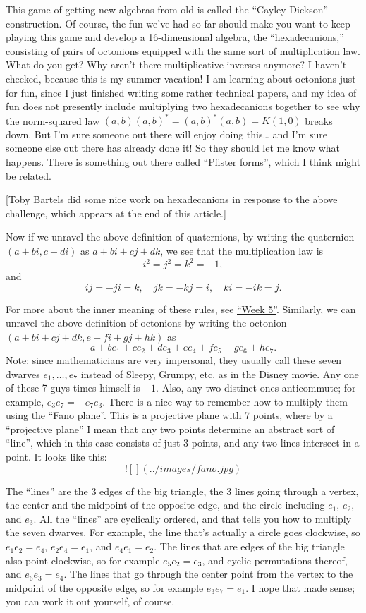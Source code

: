 \documentclass{article}
\begin{document}
This game of getting new algebras from old is called the
``Cayley-Dickson'' construction. Of course, the fun we've had so far
should make you want to keep playing this game and develop a
16-dimensional algebra, the ``hexadecanions,'' consisting of pairs of
octonions equipped with the same sort of multiplication law. What do you
get? Why aren't there multiplicative inverses anymore? I haven't
checked, because this is my summer vacation! I am learning about
octonions just for fun, since I just finished writing some rather
technical papers, and my idea of fun does not presently include
multiplying two hexadecanions together to see why the norm-squared law
\((a,b) (a,b)^* = (a,b)^* (a,b) = K (1,0)\) breaks down. But I'm sure
someone out there will enjoy doing this\ldots{} and I'm sure someone
else out there has already done it! So they should let me know what
happens. There is something out there called ``Pfister forms'', which I
think might be related.

{[}Toby Bartels did some nice work on hexadecanions in response to the
above challenge, which appears at the end of this article.{]}

Now if we unravel the above definition of quaternions, by writing the
quaternion \((a+bi,c+di)\) as \(a+bi+cj+dk\), we see that the
multiplication law is \[i^2 = j^2 = k^2 = -1,\] and
\[ij = -ji = k, \quad jk = -kj = i, \quad ki = -ik = j.\]

For more about the inner meaning of these rules, see
\protect\hyperlink{week5}{``Week 5''}. Similarly, we can unravel the
above definition of octonions by writing the octonion
\((a+bi+cj+dk,e+fi+gj+hk)\) as
\[a + b e_1 + c e_2 + d e_3 + e e_4 + f e_5 + g e_6 + h e_7.\] Note:
since mathematicians are very impersonal, they usually call these seven
dwarves \(e_1,\ldots,e_7\) instead of Sleepy, Grumpy, etc. as in the
Disney movie. Any one of these 7 guys times himself is \(-1\). Also, any
two distinct ones anticommute; for example, \(e_3 e_7 = -e_7 e_3\).
There is a nice way to remember how to multiply them using the ``Fano
plane''. This is a projective plane with 7 points, where by a
``projective plane'' I mean that any two points determine an abstract
sort of ``line'', which in this case consists of just 3 points, and any
two lines intersect in a point. It looks like this:
\[![](../images/fano.jpg)\]

The ``lines'' are the 3 edges of the big triangle, the 3 lines going
through a vertex, the center and the midpoint of the opposite edge, and
the circle including \(e_1\), \(e_2\), and \(e_3\). All the ``lines''
are cyclically ordered, and that tells you how to multiply the seven
dwarves. For example, the line that's actually a circle goes clockwise,
so \(e_1 e_2 = e_4\), \(e_2 e_4 = e_1\), and \(e_4 e_1 = e_2\). The
lines that are edges of the big triangle also point clockwise, so for
example \(e_5 e_2 = e_3\), and cyclic permutations thereof, and
\(e_6 e_3 = e_4\). The lines that go through the center point from the
vertex to the midpoint of the opposite edge, so for example
\(e_3 e_7 = e_1\). I hope that made sense; you can work it out yourself,
of course.
\end{document}
